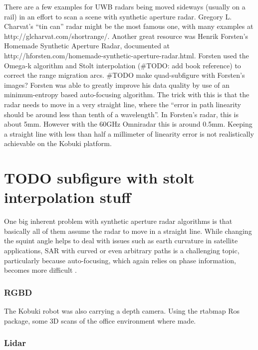 There are a few examples for UWB radars being moved sideways (usually on
a rail) in an effort to scan a scene with synthetic aperture radar.
Gregory L. Charvat's ``tin can'' radar \cite{Charvat2014} might be the
most famous one, with many examples at http://glcharvat.com/shortrange/.
Another great resource was Henrik Forsten's Homemade Synthetic Aperture
Radar, documented at
http://hforsten.com/homemade-synthetic-aperture-radar.html. Forsten used
the Omega-k algorithm \cite{Tolman2008} and Stolt interpolation (\#TODO:
add book reference) to correct the range migration arcs. \#TODO make
quad-subfigure with Forsten's images? Forsten was able to greatly
improve his data quality by use of an minimum-entropy based
auto-focusing algorithm. The trick with this is that the radar needs to
move in a very straight line, where the ``error in path linearity should
be around less than tenth of a wavelength''. In Forsten's radar, this is
about 5mm. However with the 60GHz Omniradar this is around 0.5mm.
Keeping a straight line with less than half a millimeter of linearity
error is not realistically achievable on the Kobuki platform.

\section{TODO subfigure with stolt interpolation
stuff}\label{todo-subfigure-with-stolt-interpolation-stuff}

One big inherent problem with synthetic aperture radar algorithms is
that basically all of them assume the radar to move in a straight line.
While changing the squint angle helps to deal with issues such as earth
curvature in satellite applications, SAR with curved or even arbitrary
paths is a challenging topic, particularly because auto-focusing, which
again relies on phase information, becomes more difficult
\cite{Axelsson2002}.

\subsubsection{RGBD}\label{rgbd-1}

The Kobuki robot was also carrying a depth camera. Using the rtabmap Ros
package, some 3D scans of the office environment where made.

\subsubsection{Lidar}\label{lidar-1}

